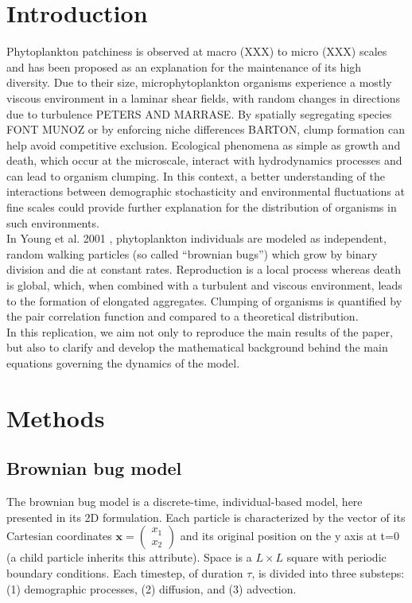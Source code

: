 
\section*{Introduction}

Phytoplankton patchiness is observed at macro (XXX) to micro (XXX) scales and has been proposed as an explanation for the maintenance of its high diversity. Due to their size, microphytoplankton organisms experience a mostly viscous environment in a laminar shear fields, with random changes in directions due to turbulence PETERS AND MARRASE. By spatially segregating species FONT MUNOZ or by enforcing niche differences BARTON, clump formation can help avoid competitive exclusion. Ecological phenomena as simple as growth and death, which occur at the microscale, interact with hydrodynamics processes and can lead to organism clumping. In this context, a better understanding of the interactions between demographic stochasticity and environmental fluctuations at fine scales could provide further explanation for the distribution of organisms in such environments. \\

In Young et al. 2001 \cite{young_reproductive_2001}, phytoplankton individuals are modeled as independent, random walking particles (so called ``brownian bugs'') which grow by binary division and die at constant rates. Reproduction is a local process whereas death is global, which, when combined with a turbulent and viscous environment, leads to the formation of elongated aggregates. Clumping of organisms is quantified by the pair correlation function and compared to a theoretical distribution. \\

In this replication, we aim not only to reproduce the main results of the paper, but also to clarify and develop the mathematical background behind the main equations governing the dynamics of the model. 
 

\section*{Methods}

\subsection*{Brownian bug model}
The brownian bug model is a discrete-time, individual-based model, here presented in its 2D formulation. Each particle is characterized by the vector of its Cartesian coordinates $\mathbf{x}=\begin{pmatrix} 
      x_1\\ 
      x_2 
\end{pmatrix}$ and its original position on the y axis at t=0 (a child particle inherits this attribute). Space is a $L\times L$ square with periodic boundary conditions. Each timestep, of duration $\tau$, is divided into three substeps: (1) demographic processes, (2) diffusion, and (3) advection. \\

